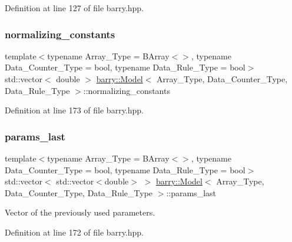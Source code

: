 Definition at line 127 of file barry.\+hpp.

\mbox{\label{classbarry_1_1_model_a600630f5fad408c157b21404dbde4bc1}} 
\subsubsection{\texorpdfstring{normalizing\+\_\+constants}{normalizing\_constants}}
{\footnotesize\ttfamily template$<$typename Array\+\_\+\+Type  = B\+Array$<$$>$, typename Data\+\_\+\+Counter\+\_\+\+Type  = bool, typename Data\+\_\+\+Rule\+\_\+\+Type  = bool$>$ \\
std\+::vector$<$ double $>$ \hyperlink{classbarry_1_1_model}{barry\+::\+Model}$<$ Array\+\_\+\+Type, Data\+\_\+\+Counter\+\_\+\+Type, Data\+\_\+\+Rule\+\_\+\+Type $>$\+::normalizing\+\_\+constants}



Definition at line 173 of file barry.\+hpp.

\mbox{\label{classbarry_1_1_model_ace8577c5c0c7bd927a2337515155ab6f}} 
\subsubsection{\texorpdfstring{params\+\_\+last}{params\_last}}
{\footnotesize\ttfamily template$<$typename Array\+\_\+\+Type  = B\+Array$<$$>$, typename Data\+\_\+\+Counter\+\_\+\+Type  = bool, typename Data\+\_\+\+Rule\+\_\+\+Type  = bool$>$ \\
std\+::vector$<$ std\+::vector$<$double$>$ $>$ \hyperlink{classbarry_1_1_model}{barry\+::\+Model}$<$ Array\+\_\+\+Type, Data\+\_\+\+Counter\+\_\+\+Type, Data\+\_\+\+Rule\+\_\+\+Type $>$\+::params\+\_\+last}



Vector of the previously used parameters. 



Definition at line 172 of file barry.\+hpp.

\mbox{\label{classbarry_1_1_model_ae5aad2049cc19ee36e9c2cfefd65a0dd}} 
